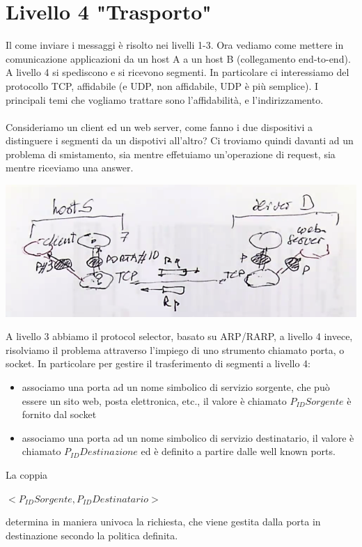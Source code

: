 \documentclass[11pt, oneside]{article}   	%
\begin{document}
\section*{Livello 4 "Trasporto"}
Il come inviare i messaggi è risolto nei livelli 1-3. Ora vediamo come mettere in comunicazione applicazioni da un host A a un host B (collegamento end-to-end). \\
A livello 4 si spediscono e si ricevono segmenti. In particolare ci interessiamo del protocollo TCP, affidabile (e UDP, non affidabile, UDP è più semplice). I principali temi che vogliamo trattare sono l'affidabilità, e l'indirizzamento.\\\\
Consideriamo un client ed un web server, come fanno i due dispositivi a distinguere i segmenti da un dispotivi all'altro? Ci troviamo quindi davanti ad un problema di smistamento, sia mentre effetuiamo un'operazione di request, sia mentre riceviamo una answer.
\begin{center}
\includegraphics[scale=0.5]{t1}
\end{center}
A livello 3 abbiamo il protocol selector, basato su ARP/RARP, a livello 4 invece, risolviamo il problema attraverso l'impiego di uno strumento chiamato porta, o socket. In particolare per gestire il trasferimento di segmenti a livello 4:
\begin{itemize}
\item associamo una porta ad un nome simbolico di servizio sorgente, che può essere un sito web, posta elettronica, etc., il valore è chiamato $P_{ID}Sorgente$ è fornito dal socket
\item associamo una porta ad un nome simbolico di servizio destinatario, il valore è chiamato $P_{ID}Destinazione$ ed è definito a partire dalle well known ports.
\end{itemize}
La coppia \begin{center}
$<P_{ID}Sorgente,P_{ID}Destinatario>$ \end{center}determina in maniera univoca la richiesta, che viene gestita dalla porta in destinazione secondo la politica definita. \\
\end{document}
